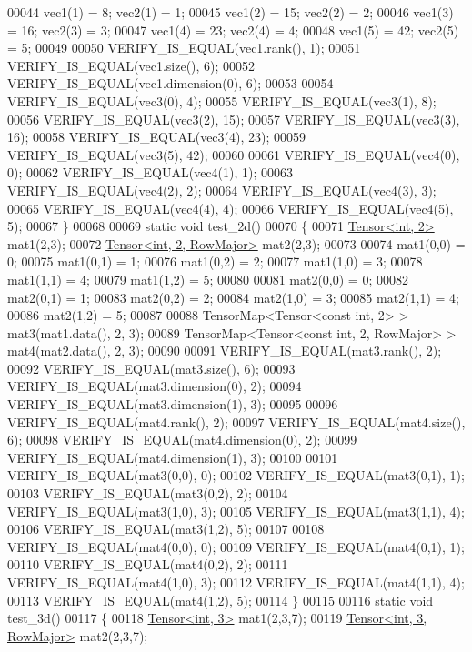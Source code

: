 \begin{DoxyCode}
00044   vec1(1) = 8;  vec2(1) = 1;
00045   vec1(2) = 15; vec2(2) = 2;
00046   vec1(3) = 16; vec2(3) = 3;
00047   vec1(4) = 23; vec2(4) = 4;
00048   vec1(5) = 42; vec2(5) = 5;
00049 
00050   VERIFY\_IS\_EQUAL(vec1.rank(), 1);
00051   VERIFY\_IS\_EQUAL(vec1.size(), 6);
00052   VERIFY\_IS\_EQUAL(vec1.dimension(0), 6);
00053 
00054   VERIFY\_IS\_EQUAL(vec3(0), 4);
00055   VERIFY\_IS\_EQUAL(vec3(1), 8);
00056   VERIFY\_IS\_EQUAL(vec3(2), 15);
00057   VERIFY\_IS\_EQUAL(vec3(3), 16);
00058   VERIFY\_IS\_EQUAL(vec3(4), 23);
00059   VERIFY\_IS\_EQUAL(vec3(5), 42);
00060 
00061   VERIFY\_IS\_EQUAL(vec4(0), 0);
00062   VERIFY\_IS\_EQUAL(vec4(1), 1);
00063   VERIFY\_IS\_EQUAL(vec4(2), 2);
00064   VERIFY\_IS\_EQUAL(vec4(3), 3);
00065   VERIFY\_IS\_EQUAL(vec4(4), 4);
00066   VERIFY\_IS\_EQUAL(vec4(5), 5);
00067 \}
00068 
00069 \textcolor{keyword}{static} \textcolor{keywordtype}{void} test\_2d()
00070 \{
00071   \hyperlink{class_eigen_1_1_tensor}{Tensor<int, 2>} mat1(2,3);
00072   \hyperlink{class_eigen_1_1_tensor}{Tensor<int, 2, RowMajor>} mat2(2,3);
00073 
00074   mat1(0,0) = 0;
00075   mat1(0,1) = 1;
00076   mat1(0,2) = 2;
00077   mat1(1,0) = 3;
00078   mat1(1,1) = 4;
00079   mat1(1,2) = 5;
00080 
00081   mat2(0,0) = 0;
00082   mat2(0,1) = 1;
00083   mat2(0,2) = 2;
00084   mat2(1,0) = 3;
00085   mat2(1,1) = 4;
00086   mat2(1,2) = 5;
00087 
00088   TensorMap<Tensor<const int, 2> > mat3(mat1.data(), 2, 3);
00089   TensorMap<Tensor<const int, 2, RowMajor> > mat4(mat2.data(), 2, 3);
00090 
00091   VERIFY\_IS\_EQUAL(mat3.rank(), 2);
00092   VERIFY\_IS\_EQUAL(mat3.size(), 6);
00093   VERIFY\_IS\_EQUAL(mat3.dimension(0), 2);
00094   VERIFY\_IS\_EQUAL(mat3.dimension(1), 3);
00095 
00096   VERIFY\_IS\_EQUAL(mat4.rank(), 2);
00097   VERIFY\_IS\_EQUAL(mat4.size(), 6);
00098   VERIFY\_IS\_EQUAL(mat4.dimension(0), 2);
00099   VERIFY\_IS\_EQUAL(mat4.dimension(1), 3);
00100 
00101   VERIFY\_IS\_EQUAL(mat3(0,0), 0);
00102   VERIFY\_IS\_EQUAL(mat3(0,1), 1);
00103   VERIFY\_IS\_EQUAL(mat3(0,2), 2);
00104   VERIFY\_IS\_EQUAL(mat3(1,0), 3);
00105   VERIFY\_IS\_EQUAL(mat3(1,1), 4);
00106   VERIFY\_IS\_EQUAL(mat3(1,2), 5);
00107 
00108   VERIFY\_IS\_EQUAL(mat4(0,0), 0);
00109   VERIFY\_IS\_EQUAL(mat4(0,1), 1);
00110   VERIFY\_IS\_EQUAL(mat4(0,2), 2);
00111   VERIFY\_IS\_EQUAL(mat4(1,0), 3);
00112   VERIFY\_IS\_EQUAL(mat4(1,1), 4);
00113   VERIFY\_IS\_EQUAL(mat4(1,2), 5);
00114 \}
00115 
00116 \textcolor{keyword}{static} \textcolor{keywordtype}{void} test\_3d()
00117 \{
00118   \hyperlink{class_eigen_1_1_tensor}{Tensor<int, 3>} mat1(2,3,7);
00119   \hyperlink{class_eigen_1_1_tensor}{Tensor<int, 3, RowMajor>} mat2(2,3,7);

\end{DoxyCode}
